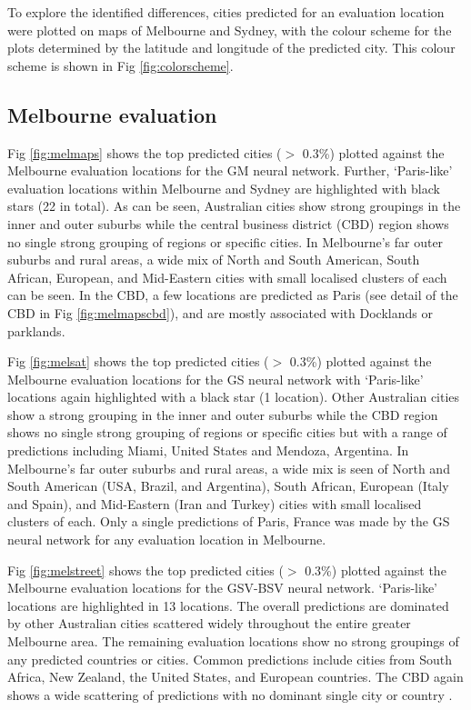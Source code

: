 \documentclass[10pt,letterpaper,hidelinks]{article}
\begin{document}
To explore the identified differences, cities predicted for an evaluation location were plotted on maps of Melbourne and Sydney, with the colour scheme for the plots determined by the latitude and longitude of the predicted city. This colour scheme is shown in Fig \ref{fig:colorscheme}. 


\subsection*{Melbourne evaluation} 

Fig \ref{fig:melmaps} shows the top predicted cities ($>$ 0.3\%) plotted against the Melbourne evaluation locations for the GM neural network. Further, `Paris-like' evaluation locations within Melbourne and Sydney are highlighted with black stars (22 in total). As can be seen, Australian cities show strong groupings in the inner and outer suburbs while the central business district (CBD) region shows no single strong grouping of regions or specific cities. In Melbourne's far outer suburbs and rural areas, a wide mix of North and South American, South African, European, and Mid-Eastern cities with small localised clusters of each can be seen. In the CBD, a few locations are predicted as Paris (see detail of the CBD in Fig \ref{fig:melmapscbd}), and are mostly associated with Docklands or parklands.

Fig \ref{fig:melsat} shows the top predicted cities ($>$ 0.3\%) plotted against the Melbourne evaluation locations for the GS neural network with `Paris-like' locations again highlighted with a black star (1 location). Other Australian cities show a strong grouping in the inner and outer suburbs while the CBD region shows no single strong grouping of regions or specific cities but with a range of predictions including Miami, United States and Mendoza, Argentina. In Melbourne's far outer suburbs and rural areas, a wide mix is seen of North and South American (USA, Brazil, and Argentina), South African, European (Italy and Spain), and Mid-Eastern (Iran and Turkey) cities with small localised clusters of each. Only a single predictions of Paris, France was made by the GS neural network for any evaluation location in Melbourne.

Fig \ref{fig:melstreet} shows the top predicted cities ($>$ 0.3\%) plotted against the Melbourne evaluation locations for the GSV-BSV neural network. `Paris-like' locations are highlighted in 13 locations. The overall predictions are dominated by other Australian cities scattered widely throughout the entire greater Melbourne area. The remaining evaluation locations show no strong groupings of any predicted countries or cities. Common predictions include cities from South Africa, New Zealand, the United States, and European countries. The CBD again shows a wide scattering of predictions with no dominant single city or country .
\end{document}
